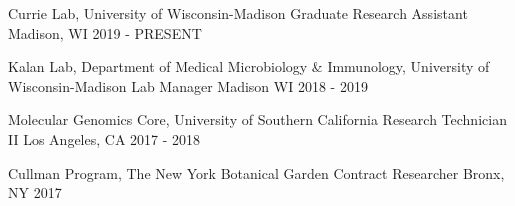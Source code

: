 
\begin{cventries}
  \cventry
    {Currie Lab, University of Wisconsin-Madison} %
    {Graduate Research Assistant} %
    {Madison, WI} %
    {2019 - PRESENT} %

  \cventry
    {Kalan Lab, Department of Medical Microbiology & Immunology, University of Wisconsin-Madison} %
    {Lab Manager} %
    {Madison WI} %
    {2018 - 2019} %

  \cventry
    {Molecular Genomics Core, University of Southern California} %
    {Research Technician II} %
    {Los Angeles, CA} %
    {2017 - 2018} %

  \cventry
    {Cullman Program, The New York Botanical Garden} %
    {Contract Researcher} %
    {Bronx, NY} %
    {2017} %


\end{cventries}
